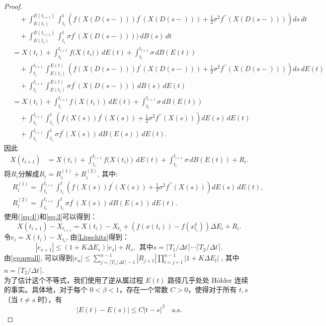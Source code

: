 \begin{proof}
\begin{align*}
		&\quad + \int_{E(t_i)}^{E(t_{i+1})} \int_{t_i}^{t}\left( f(X(D(s-))) f^{\prime}(X(D(s-))) + \frac{1}{2} \sigma^2 f^{\prime\prime}(X(D(s-))) \right) ds \, dt \\
		&\quad + \int_{E(t_i)}^{E(t_{i+1})} \int_{t_i}^{t}\sigma f^{\prime}(X(D(s-)))) \, dB(s) \, dt \\
		&= X(t_i) + \int_{t_i}^{t_{i+1}} f(X({t_i)}) \, dE(t) + \int_{t_i}^{t_{i+1}} \sigma \, dB(E(t)) \\
		&\quad + \int_{t_i}^{t_{i+1}} \int_{E(t_i)}^{E(t)} \left( f(X(D(s-))) f^{\prime}(X(D(s-))) + \frac{1}{2} \sigma^2 f^{\prime\prime}(X(D(s-))) \right) ds \, dE(t) \\
		&\quad + \int_{t_i}^{t_{i+1}} \int_{E(t_i)}^{E(t)}\sigma f^{\prime}(X(D(s-))) \, dB(s) \, dE(t)\\
		&= X(t_i) + \int_{t_i}^{t_{i+1}} f(X({t_i})) \, dE(t) + \int_{t_i}^{t_{i+1}} \sigma \, dB(E(t)) \\
		&\quad + \int_{t_i}^{t_{i+1}} \int_{t_i}^{t} \left( f(X(s)) f^{\prime}(X(s)) + \frac{1}{2} \sigma^2 f^{\prime\prime}(X(s)) \right) dE(s) \, dE(t) \\
		&\quad + \int_{t_i}^{t_{i+1}} \int_{t_i}^{t}\sigma f^{\prime}(X(s)) \, dB(E(s)) \, dE(t). 
	\end{align*}
	因此
	\begin{align}\label{eq:3}
		X(t_{i+1})
		&= X(t_i) + \int_{t_i}^{t_{i+1}} f(X({t_i)}) \, dE(t) + \int_{t_i}^{t_{i+1}} \sigma \, dB(E(t)) + R_i. 
	\end{align}
	将$R_i$分解成$R_i = R_i^{(1)} + R_i^{(2)}$, 其中:
	\begin{align*}
		& R_i^{(1)} = \int_{t_i}^{t_{i+1}} \int_{t_i}^{t} \left( f(X(s)) f^{\prime}(X(s)) + \frac{1}{2} \sigma^2 f^{\prime\prime}(X(s)) \right) dE(s) \, dE(t), \\
		& R_i^{(2)} = \int_{t_i}^{t_{i+1}} \int_{t_i}^{t} \sigma f^{\prime}(X(s)) \, dB(E(s)) \, dE(t). 
	\end{align*}
	使用(\ref{eq:4})和\eqref{eq:3}可以得到：
	\begin{equation}
		X({t_{i+1}})-X_{t_{i+1}}=X({t_i})-X_{t_i}+(f{(x({t_i}))}-f{(x^\delta_{t_i})})\Delta E_{i}+R_{i}. 
	\end{equation}
	令$e_i = X({t_i})-X_{t_i}$, 由\cref{Lipschitz}得到：
	\begin{equation}
		|e_{s+1}|\leq(1+K{\Delta}E_{s})|e_{s}|+R_{s}, ~~\text{其中}s=\lceil T_1/\Delta t \rceil\cdots \lceil T_2 /\Delta t \rceil. 
	\end{equation}
	由\cref{gronwall}, 可以得到$|e_n| \leq \sum\limits_{j=\lceil T_1/\Delta t \rceil-1}^{n-1}|R_{j+1}|\prod\limits_{l=j+1}^{n-1}|1+K\Delta E_l|$
	, 其中$n = \lceil T_2/\Delta t \rceil$. \\
	为了估计这个不等式，我们使用了逆从属过程 \( E(t) \) 路径几乎处处 Hölder 连续的事实。具体地，对于每个 \( 0 < \beta < 1 \)，存在一个常数 \( C > 0 \)，使得对于所有 \( t, s \)（当 \( t \neq s \) 时），有
	\[
	|E(t) - E(s)| \leq C |t - s|^\beta \quad \text{a.s.}
	\]
	

\end{proof}
